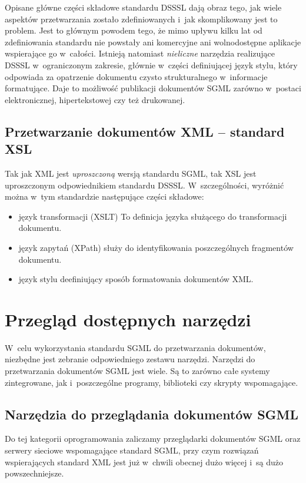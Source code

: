 \documentclass[brudnopis]{xmgr}
\begin{document}
Opisane główne części składowe standardu DSSSL dają obraz tego, jak
wiele aspektów przetwarzania zostało zdefiniowanych i~jak
skomplikowany jest to problem. Jest to głównym powodem tego, że mimo
upływu kilku lat od zdefiniowania standardu nie powstały ani
komercyjne ani wolnodostępne aplikacje wspierające go
w~całości. Istnieją natomiast \emph{nieliczne\/} narzędzia realizujące
DSSSL w~ograniczonym zakresie, głównie w~części definiującej język
stylu, który odpowiada za opatrzenie dokumentu czysto strukturalnego
w~informacje formatujące. Daje to możliwość publikacji dokumentów SGML
zarówno w~postaci elektronicznej, hipertekstowej czy też drukowanej.

\section{Przetwarzanie dokumentów XML -- standard XSL\label{s:xsl}}

Tak jak XML jest \emph{uproszczoną\/} wersją standardu SGML, tak XSL
jest uproszczonym odpowiednikiem standardu DSSSL. W~szczególności,
wyróżnić można w~tym standardzie następujące części składowe:

\begin{itemize}
\item język transformacji (XSLT) To definicja języka służącego do
  transformacji dokumentu.
\item język zapytań (XPath) służy do identyfikowania poszczególnych
  fragmentów dokumentu.
\item język stylu deefiniujący sposób formatowania dokumentów XML.
\end{itemize}

\chapter{Przegląd dostępnych narzędzi\label{PRZEGLAD.NARZEDZI}}

W~celu wykorzystania standardu SGML do przetwarzania dokumentów,
niezbędne jest zebranie odpowiedniego zestawu narzędzi. Narzędzi do
przetwarzania dokumentów SGML jest wiele. Są to zarówno całe
systemy zintegrowane, jak i~poszczególne programy, biblioteki czy
skrypty wspomagające.

\section{Narzędzia do przeglądania dokumentów SGML}

Do tej kategorii oprogramowania zaliczamy przeglądarki dokumentów
SGML oraz serwery sieciowe wspomagające standard SGML, przy
czym rozwiązań wspierających standard XML jest już w~chwili obecnej
dużo więcej i~są dużo powszechniejsze.
\end{document}
